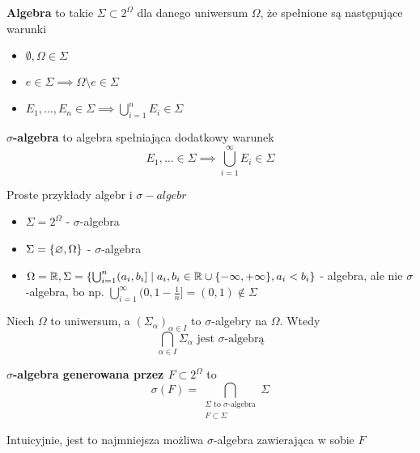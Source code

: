 \begin{definition}
	\textbf{Algebra} to takie \(\Sigma \subset 2^{\Omega}\) dla danego uniwersum \(\Omega\), że spełnione są następujące warunki
	\begin{itemize}
		\item \(\emptyset, \Omega \in \Sigma\)
		\item \(e \in \Sigma \implies \Omega \setminus e \in \Sigma\)
		\item \(E_1, \dots, E_n \in \Sigma \implies \bigcup_{i=1}^n E_i \in \Sigma\)
	\end{itemize}
\end{definition}

\begin{definition}
	\label{sigma-algebra-definition}
	\textbf{\(\sigma\)-algebra} to algebra spełniająca dodatkowy warunek
	\[
		E_1, \dots \in \Sigma \implies \bigcup_{i=1}^{\infty} E_i \in \Sigma
	\]
\end{definition}

\begin{example}
	Proste przykłady algebr i \(\sigma-algebr\)
	\begin{itemize}
		\item \(\Sigma = 2^{\Omega}\) - \(\sigma\)-algebra
		\item \(\Sigma = \set{\emptyset, \Omega}\) - \(\sigma\)-algebra
		\item \(\Omega = \real, \Sigma = \set{\bigcup_{i=1}^n (a_i, b_i] \mid a_i, b_i \in \real \cup \set{-\infty, +\infty}, a_i < b_i}\) - algebra, ale nie \(\sigma\)-algebra, bo np. \(\bigcup_{i=1}^\infty (0, 1 - \frac{1}{n}] = (0, 1) \notin \Sigma\)
	\end{itemize}
\end{example}

\begin{lemma}
	Niech \(\Omega\) to uniwersum, a \((\Sigma_\alpha)_{\alpha \in I}\) to \(\sigma\)-algebry na \(\Omega\). Wtedy
	\[
		\bigcap_{\alpha \in I} \Sigma_\alpha \text{ jest \(\sigma\)-algebrą}
	\]
\end{lemma}

\begin{definition}
	\textbf{\(\sigma\)-algebra generowana przez \(F \subset 2^\Omega\)} to
	\[
		\sigma(F) = \bigcap_{\substack{\Sigma \text{ to } \sigma\text{-algebra}\\F \subset \Sigma}} \Sigma
	\]
	
	Intuicyjnie, jest to najmniejsza możliwa \(\sigma\)-algebra zawierająca w sobie \(F\)
\end{definition}

